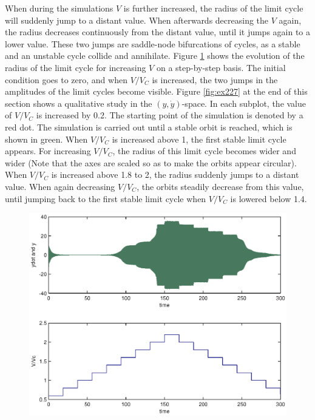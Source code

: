 \newline
When during the simulations $V$ is further increased, the radius of the limit cycle will suddenly jump to a distant value. When afterwards decreasing the $V$ again, the radius decreases continuously from the distant value, until it jumps again to a lower value. These two jumps are saddle-node bifurcations of cycles, as a stable and an unstable cycle collide and annihilate. Figure \ref{fig:ex227b} shows the evolution of the radius of the limit cycle for increasing $V$ on a step-by-step basis. The initial condition goes to zero, and when $V/V_C$ is increased, the two jumps in the amplitudes of the limit cycles become visible. Figure \ref{fig:ex227} at the end of this section shows a qualitative study in the $(y,\dot{y})$-space. In each subplot, the value of $V/V_C$ is increased by 0.2. The starting point of the simulation is denoted by a red dot. The simulation is carried out until a stable orbit is reached, which is shown in green. When $V/V_C$ is increased above 1, the first stable limit cycle appears. For increasing $V/V_C$, the radius of this limit cycle becomes wider and wider (Note that the axes are scaled so as to make the orbits appear circular).  When $V/V_C$ is increased above 1.8 to 2, the radius suddenly jumps to a distant value. When again decreasing $V/V_C$, the orbits steadily decrease from this value, until jumping back to the first stable limit cycle when $V/V_C$ is lowered below 1.4.  
\begin{figure}[htp]
\centering
\includegraphics{img/ex2/27b.eps}
\caption{}
\label{fig:ex227b}
\end{figure}

